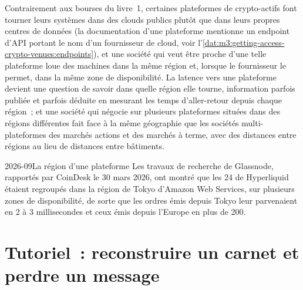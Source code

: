 Contrairement aux bourses du livre~1, certaines plateformes de crypto-actifs font tourner leurs systèmes dans des clouds publics plutôt que dans leurs propres centres de données (la
documentation d'une plateforme mentionne un endpoint d'API portant le nom d'un fournisseur de cloud, voir l'\cref{dat:m3:getting-access-crypto-venues:endpoints}), et une société qui veut être proche d'une telle
plateforme loue des machines dans la même région et, lorsque le fournisseur le permet, dans la même zone de disponibilité. La latence vers une plateforme devient une question de savoir dans quelle
région elle tourne, information parfois publiée et parfois déduite en mesurant les temps d'aller-retour depuis chaque région~; et une société qui négocie sur plusieurs plateformes
situées dans des régions différentes fait face à la même géographie que les sociétés multi-plateformes des marchés actions et des marchés à terme, avec des distances entre régions au lieu de distances entre
bâtiments.

\begin{dated}{2026-09}{La région d'une plateforme}\label{dat:m3:crypto-data-and-infrastructure:region}
Les travaux de recherche de Glassnode, rapportés par CoinDesk le 30 mars 2026, ont montré que les 24  de Hyperliquid étaient regroupés dans la région de Tokyo d'Amazon Web Services, sur
plusieurs zones de disponibilité, de sorte que les ordres émis depuis Tokyo leur parvenaient en 2 à 3 millisecondes et ceux émis depuis l'Europe en plus de 200.
\end{dated}

\section{Tutoriel~: reconstruire un carnet et perdre un message}\label{tut:m3:crypto-data-and-infrastructure:book}

